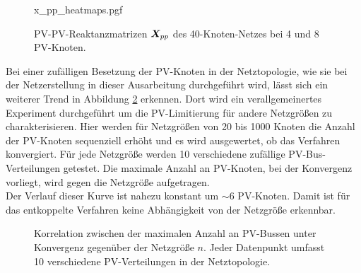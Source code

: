 
\begin{figure}[htbp]
	\centering
    {x_pp_heatmaps.pgf}
	\caption{PV-PV-Reaktanzmatrizen $\boldsymbol{X}_{pp}$ des 40-Knoten-Netzes bei 4 und 8 PV-Knoten.}
	\label{fig:x_pp_heatmaps}
\end{figure}

Bei einer zufälligen Besetzung der PV-Knoten in der Netztopologie, wie sie bei der Netzerstellung in dieser Ausarbeitung durchgeführt wird, lässt sich ein weiterer Trend in Abbildung \ref{fig:max_pv_convergence} erkennen.
Dort wird ein verallgemeinertes Experiment durchgeführt um die PV-Limitierung für andere Netzgrößen zu charakterisieren.
Hier werden für Netzgrößen von 20 bis 1000 Knoten die Anzahl der PV-Knoten sequenziell erhöht und es wird ausgewertet, ob das Verfahren konvergiert.
Für jede Netzgröße werden 10 verschiedene zufällige PV-Bus-Verteilungen getestet.
Die maximale Anzahl an PV-Knoten, bei der Konvergenz vorliegt, wird gegen die Netzgröße aufgetragen.\\
Der Verlauf dieser Kurve ist nahezu konstant um $\sim6$ PV-Knoten. 
Damit ist für das entkoppelte Verfahren keine Abhängigkeit von der Netzgröße erkennbar.





\begin{figure}[htbp]
	\centering
	
	\caption{Korrelation zwischen der maximalen Anzahl an PV-Bussen unter Konvergenz gegenüber der Netzgröße $n$. Jeder Datenpunkt umfasst 10 verschiedene PV-Verteilungen in der Netztopologie.}
	\label{fig:max_pv_convergence}
\end{figure}

